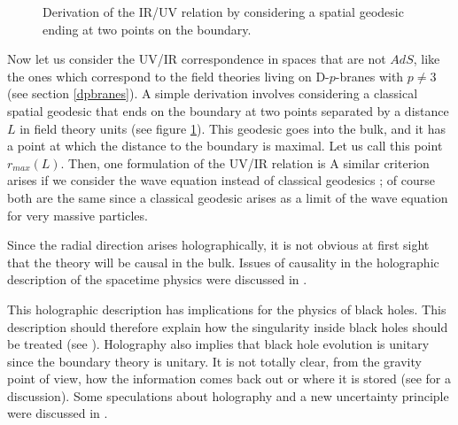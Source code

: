 \begin{figure}[htb]
\begin{center}
\epsfxsize=1.5in\leavevmode{}
\end{center}
\caption{
Derivation of the IR/UV relation by considering a spatial 
geodesic ending at two points on the boundary. 
}
\label{geodesic}
\end{figure} 


Now let us consider the UV/IR correspondence in spaces that are not
$AdS$, like the ones which correspond to the field theories 
living on D-$p$-branes
with $p \not = 3$ (see section \ref{dpbranes}). 
A simple derivation involves  considering
 a classical spatial geodesic
that ends on the boundary at two points separated by a distance $L$ in 
field theory units (see figure \ref{geodesic}). 
 This geodesic goes into the bulk, and it 
has  a point at which the distance to the boundary is maximal.
Let us call this point $r_{max}(L)$. Then, one formulation of 
the UV/IR relation is
A similar criterion arises if we consider the wave equation 
instead of classical geodesics \cite{Peet:1998wn};
of course both are the 
same since a classical geodesic arises as a limit of the wave equation
for very massive particles. 

Since the radial  direction arises holographically, it is not obvious
at first sight that the theory will be causal in the bulk.
Issues of causality in the holographic description of the spacetime
physics were discussed in 
\cite{Kabat:1999yq,Balasubramanian:1999ri,Horowitz:1999gf,%
Giddings:1999qu}. 

This holographic description has implications for the physics 
of black holes. This description
should therefore explain how the singularity inside black holes
should be treated (see \cite{Horowitz:1998pq}).
Holography also  implies that black hole evolution is 
unitary since the boundary theory is unitary.  
It is not totally clear, from the gravity point of view, how
the information comes back out or where it is stored
 (see \cite{Lowe:1999pk} for a discussion).
Some speculations about  holography and a 
 new uncertainty principle were 
discussed in \cite{Minic:1998nu}.























